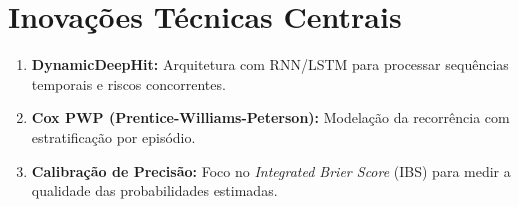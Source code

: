 \section{Inovações Técnicas Centrais}
\begin{enumerate}
    \item \textbf{DynamicDeepHit:} Arquitetura com RNN/LSTM para processar sequências temporais e riscos concorrentes.
    \item \textbf{Cox PWP (Prentice-Williams-Peterson):} Modelação da recorrência com estratificação por episódio.
    \item \textbf{Calibração de Precisão:} Foco no \textit{Integrated Brier Score} (IBS) para medir a qualidade das probabilidades estimadas.
\end{enumerate}
